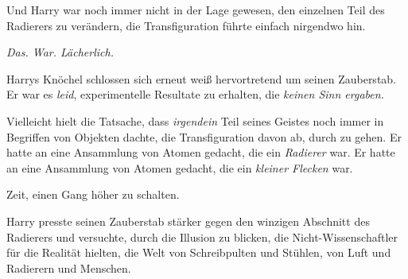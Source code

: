 Und Harry war noch immer nicht in der Lage gewesen, den einzelnen Teil des Radierers zu verändern, die Transfiguration führte einfach nirgendwo hin.

\emph{Das. War. Lächerlich.}

Harrys Knöchel schlossen sich erneut weiß hervortretend um seinen Zauberstab. Er war es \emph{leid}, experimentelle Resultate zu erhalten, die \emph{keinen Sinn ergaben.}

Vielleicht hielt die Tatsache, dass \emph{irgendein} Teil seines Geistes noch immer in Begriffen von Objekten dachte, die Transfiguration davon ab, durch zu gehen. Er hatte an eine Ansammlung von Atomen gedacht, die ein \emph{Radierer} war. Er hatte an eine Ansammlung von Atomen gedacht, die ein \emph{kleiner Flecken} war.

Zeit, einen Gang höher zu schalten.

Harry presste seinen Zauberstab stärker gegen den winzigen Abschnitt des Radierers und versuchte, durch die Illusion zu blicken, die Nicht-Wissenschaftler für die Realität hielten, die Welt von Schreibpulten und Stühlen, von Luft und Radierern und Menschen.

